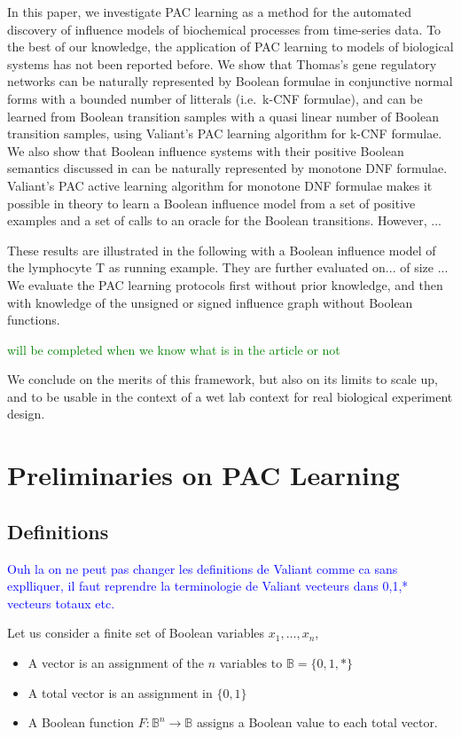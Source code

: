 \documentclass{llncs}
\newcommand{\francois}[1]{\textcolor{blue}{#1}}
\newcommand{\sylvain}[1]{\textcolor{green}{#1}}
\begin{document}
In this paper, we investigate PAC learning as a method for the automated discovery of influence models of biochemical processes from time-series data. 
To the best of our knowledge, 
the application of PAC learning to models of biological systems has not been reported before.
We show that Thomas's gene regulatory networks \cite{Thomas91jtb,Thomas73jtb} can be naturally represented by 
Boolean formulae in conjunctive normal forms with a bounded number of litterals (i.e.~k-CNF formulae),
and can be learned from Boolean transition samples with a quasi linear number of Boolean transition samples, using Valiant's PAC learning algorithm for k-CNF formulae.
We also show that Boolean influence systems with their positive Boolean semantics discussed in \cite{FMRS16cmsb}
can be naturally represented by monotone DNF formulae.
Valiant's PAC active learning algorithm for monotone DNF formulae makes it possible in theory 
to learn a Boolean influence model from a set of positive examples and a set of calls to an oracle for the Boolean transitions.
However, ...

These results are illustrated in the following with a Boolean influence model of the lymphocyte T as running example.
They are further evaluated on... of size ...
We evaluate the PAC learning protocols first without prior knowledge, and then with knowledge of the unsigned or signed influence graph without Boolean functions.

\sylvain{will be completed when we know what is in the article or not}

We conclude on the merits of this framework, but also on its limits to scale up,
and to be usable in the context of a wet lab context for real biological experiment design.


\section{Preliminaries on PAC Learning}\label{pac}

\subsection{Definitions}

\francois{Ouh la on ne peut pas changer les definitions de Valiant comme ca sans explliquer,
il faut reprendre la terminologie de Valiant vecteurs dans {0,1,*} vecteurs totaux etc.}

Let us consider a finite set of Boolean variables $x_1,\ldots,x_n$,
\begin{itemize}
	\item A vector is an assignment of the $n$ variables to $\mathbb{B} = \{0,1,*\}$
	\item A total vector is an assignment in $\{0,1\}$
	\item A Boolean function $F:{\mathbb{B}}^n \rightarrow \mathbb{B}$
	assigns a Boolean value to each total vector.
\end{itemize}
\end{document}
